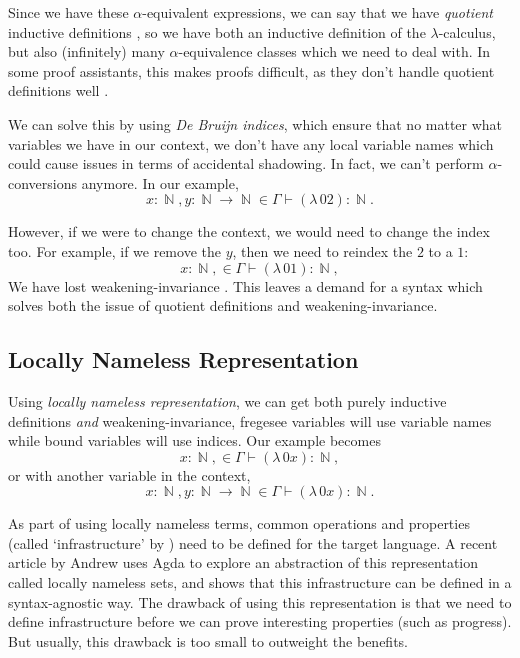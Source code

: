 \documentclass[logo,bsc,singlespacing,parskip,online]{infthesis}
\DeclareMathOperator{\nat}{\mathbb{N}}
\begin{document}
Since we have these $\alpha$-equivalent expressions, we can say that we have \textit{quotient}
inductive definitions \citep{aydemir_engineering_2008}, so we have both an inductive definition of
the $\lambda$-calculus, but also (infinitely) many $\alpha$-equivalence classes which we need to
deal with. In some proof assistants, this makes proofs difficult, as they don't handle quotient
definitions well \citep{pitts_locally_2023}.

We can solve this by using \textit{De Bruijn indices}, which ensure that no matter what variables we
have in our context, we don't have any local variable names which could cause issues in terms of
accidental shadowing. In fact, we can't perform $\alpha$-conversions anymore. In our example,
\begin{equation*}
  x \colon \nat, y \colon \nat \to \nat \in \Gamma \vdash (\lambda \, 0 2) \colon \nat.
\end{equation*}

However, if we were to change the context, we would need to change the index too. For example, if we
remove the $y$, then we need to reindex the $2$ to a $1$:
\begin{equation*}
  x \colon \nat, \in \Gamma \vdash (\lambda \, 0 1) \colon \nat,
\end{equation*}
We have lost weakening-invariance \citep{aydemir_engineering_2008}. This leaves a demand for a
syntax which solves both the issue of quotient definitions and weakening-invariance.

\subsection{Locally Nameless Representation}
Using \textit{locally nameless representation}, we can get both purely inductive definitions
\textit{and} weakening-invariance, fregesee variables will use variable names while bound variables will
use indices. Our example becomes
\begin{equation*}
  x \colon \nat, \in \Gamma \vdash (\lambda \, 0 x) \colon \nat,
\end{equation*}
or with another variable in the context,
\begin{equation*}
  x \colon \nat, y \colon \nat \to \nat \in \Gamma \vdash (\lambda \, 0 x) \colon \nat.
\end{equation*}

As part of using locally nameless terms, common operations and properties (called `infrastructure'
by \citet{aydemir_engineering_2008}) need to be defined for the target language. A recent article by
Andrew \citet{pitts_locally_2023} uses Agda to explore an abstraction of this representation called
locally nameless sets, and shows that this infrastructure can be defined in a syntax-agnostic way.
The drawback of using this representation is that we need to define infrastructure before we can
prove interesting properties (such as progress). But usually, this drawback is too small to
outweight the benefits.
\end{document}
